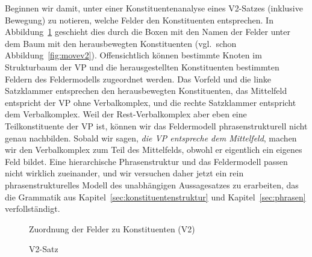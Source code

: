 Beginnen wir damit, unter einer Konstituentenanalyse eines V2-Satzes (inklusive Bewegung) zu notieren, welche Felder den Konstituenten entsprechen.
In Abbildung~\ref{fig:movev2konstituenten} geschieht dies durch die Boxen mit den Namen der Felder unter dem Baum mit den herausbewegten Konstituenten (vgl.\ schon Abbildung~\ref{fig:movev2}).
Offensichtlich können bestimmte Knoten im Strukturbaum der VP und die herausgestellten Konstituenten bestimmten Feldern des Feldermodells zugeordnet werden.
Das Vorfeld und die linke Satzklammer entsprechen den herausbewegten Konstituenten, das Mittelfeld entspricht der VP ohne Verbalkomplex, und die rechte Satzklammer entspricht dem Verbalkomplex.
Weil der Rest-Verbalkomplex aber eben eine Teilkonstituente der VP ist, können wir das Feldermodell phrasenstrukturell nicht genau nachbilden.
Sobald wir sagen, \textit{die VP entspreche dem Mittelfeld}, machen wir den Verbalkomplex zum Teil des Mittelfelds, obwohl er eigentlich ein eigenes Feld bildet.
Eine hierarchische Phrasenstruktur und das Feldermodell passen nicht wirklich zueinander, und wir versuchen daher jetzt ein rein phrasenstrukturelles Modell des unabhängigen Aussagesatzes zu erarbeiten, das die Grammatik aus Kapitel~\ref{sec:konstituentenstruktur} und Kapitel~\ref{sec:phrasen} verfollständigt.

\begin{figure}
  \caption{Zuordnung der Felder zu Konstituenten (V2)}
  \label{fig:movev2konstituenten}
\end{figure}

\begin{figure}
  \vspace{0.3cm}
  \caption{V2-Satz}
  \label{fig:v2satz}
\end{figure}

